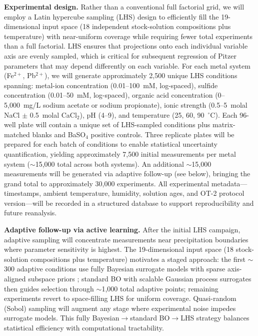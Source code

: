 \documentclass[12pt]{article}
\begin{document}
\textbf{Experimental design.} Rather than a conventional full factorial grid, we will employ a Latin hypercube sampling (LHS) design \cite{mckay1979} to efficiently fill the 19-dimensional input space (18 independent stock-solution compositions plus temperature) with near-uniform coverage while requiring fewer total experiments than a full factorial. LHS ensures that projections onto each individual variable axis are evenly sampled, which is critical for subsequent regression of Pitzer parameters that may depend differently on each variable. For each metal system (Fe$^{2+}$, Pb$^{2+}$), we will generate approximately 2,500 unique LHS conditions spanning: metal-ion concentration (0.01--100~mM, log-spaced), sulfide concentration (0.01--50~mM, log-spaced), organic acid concentration (0--5{,}000~mg/L sodium acetate or sodium propionate), ionic strength (0.5--5~molal NaCl $\pm$ 0.5~molal CaCl$_2$), pH (4--9), and temperature (25, 60, 90~$^\circ$C). Each 96-well plate will contain a unique set of LHS-sampled conditions plus matrix-matched blanks and BaSO$_4$ positive controls. Three replicate plates will be prepared for each batch of conditions to enable statistical uncertainty quantification, yielding approximately 7,500 initial measurements per metal system ($\sim$15,000 total across both systems). An additional $\sim$15,000 measurements will be generated via adaptive follow-up (see below), bringing the grand total to approximately 30,000 experiments. All experimental metadata---timestamps, ambient temperature, humidity, solution ages, and OT-2 protocol version---will be recorded in a structured database to support reproducibility and future reanalysis.

\textbf{Adaptive follow-up via active learning.} After the initial LHS campaign, adaptive sampling will concentrate measurements near precipitation boundaries where parameter sensitivity is highest. The 19-dimensional input space (18 stock-solution compositions plus temperature) motivates a staged approach: the first $\sim$300 adaptive conditions use fully Bayesian surrogate models with sparse axis-aligned subspace priors \cite{baird2022,eriksson2021}; standard BO with scalable Gaussian process surrogates then guides selection through $\sim$1{,}000 total adaptive points; remaining experiments revert to space-filling LHS for uniform coverage. Quasi-random (Sobol) sampling will augment any stage where experimental noise impedes surrogate models. This fully Bayesian$\to$standard BO$\to$LHS strategy balances statistical efficiency with computational tractability.
\end{document}
